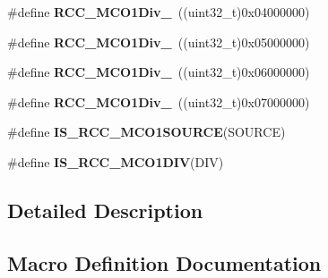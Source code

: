 \begin{DoxyCompactItemize}
\item 
\hypertarget{group___r_c_c___m_c_o1___clock___source___prescaler_gab0247962772ebf1735b7b2a84c235415}{}\#define {\bfseries R\+C\+C\+\_\+\+M\+C\+O1\+Div\+\_}~((uint32\+\_\+t)0x04000000)\label{group___r_c_c___m_c_o1___clock___source___prescaler_gab0247962772ebf1735b7b2a84c235415}

\item 
\hypertarget{group___r_c_c___m_c_o1___clock___source___prescaler_ga298d00af4cd40822e28a5a20d6cdbfb6}{}\#define {\bfseries R\+C\+C\+\_\+\+M\+C\+O1\+Div\+\_}~((uint32\+\_\+t)0x05000000)\label{group___r_c_c___m_c_o1___clock___source___prescaler_ga298d00af4cd40822e28a5a20d6cdbfb6}

\item 
\hypertarget{group___r_c_c___m_c_o1___clock___source___prescaler_ga2300f224151c8e15424142ee4fc5f549}{}\#define {\bfseries R\+C\+C\+\_\+\+M\+C\+O1\+Div\+\_}~((uint32\+\_\+t)0x06000000)\label{group___r_c_c___m_c_o1___clock___source___prescaler_ga2300f224151c8e15424142ee4fc5f549}

\item 
\hypertarget{group___r_c_c___m_c_o1___clock___source___prescaler_ga756a1097bf0e4fe15d72f113572d0c04}{}\#define {\bfseries R\+C\+C\+\_\+\+M\+C\+O1\+Div\+\_}~((uint32\+\_\+t)0x07000000)\label{group___r_c_c___m_c_o1___clock___source___prescaler_ga756a1097bf0e4fe15d72f113572d0c04}

\item 
\#define {\bfseries I\+S\+\_\+\+R\+C\+C\+\_\+\+M\+C\+O1\+S\+O\+U\+R\+C\+E}(S\+O\+U\+R\+C\+E)
\item 
\#define {\bfseries I\+S\+\_\+\+R\+C\+C\+\_\+\+M\+C\+O1\+D\+I\+V}(D\+I\+V)
\end{DoxyCompactItemize}


\subsection{Detailed Description}


\subsection{Macro Definition Documentation}
\hypertarget{group___r_c_c___m_c_o1___clock___source___prescaler_ga8a8ff14a7fcdc6ef638ca8666e609c99}{}
